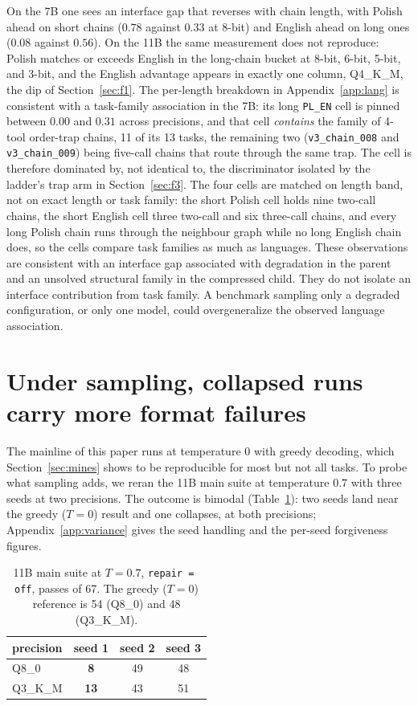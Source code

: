 \documentclass[11pt]{article}
\begin{document}
On the 7B one sees an interface gap that reverses with chain length, with Polish ahead on short chains ($0.78$ against $0.33$ at 8-bit) and English ahead on long ones ($0.08$ against $0.56$). On the 11B the same measurement does not reproduce: Polish matches or exceeds English in the long-chain bucket at 8-bit, 6-bit, 5-bit, and 3-bit, and the English advantage appears in exactly one column, Q4\_K\_M, the dip of Section~\ref{sec:f1}. The per-length breakdown in Appendix~\ref{app:lang} is consistent with a task-family association in the 7B: its long \texttt{PL\_EN} cell is pinned between $0.00$ and $0.31$ across precisions, and that cell \emph{contains} the family of 4-tool order-trap chains, 11 of its 13 tasks, the remaining two (\texttt{v3\_chain\_008} and \texttt{v3\_chain\_009}) being five-call chains that route through the same trap. The cell is therefore dominated by, not identical to, the discriminator isolated by the ladder's trap arm in Section~\ref{sec:f3}. The four cells are matched on length band, not on exact length or task family: the short Polish cell holds nine two-call chains, the short English cell three two-call and six three-call chains, and every long Polish chain runs through the neighbour graph while no long English chain does, so the cells compare task families as much as languages. These observations are consistent with an interface gap associated with degradation in the parent and an unsolved structural family in the compressed child. They do not isolate an interface contribution from task family. A benchmark sampling only a degraded configuration, or only one model, could overgeneralize the observed language association.

\section{Under sampling, collapsed runs carry more format failures}
\label{sec:variance}

The mainline of this paper runs at temperature 0 with greedy decoding, which Section~\ref{sec:mines} shows to be reproducible for most but not all tasks. To probe what sampling adds, we reran the 11B main suite at temperature $0.7$ with three seeds at two precisions. The outcome is bimodal (Table~\ref{tab:variance}): two seeds land near the greedy ($T=0$) result and one collapses, at both precisions; Appendix~\ref{app:variance} gives the seed handling and the per-seed forgiveness figures.

\begin{table}[h]
\centering\small
\caption{11B main suite at $T=0.7$, \texttt{repair\,=\,off}, passes of 67. The greedy ($T=0$) reference is 54 (Q8\_0) and 48 (Q3\_K\_M).}
\label{tab:variance}
\begin{tabular}{lccc}
\toprule
precision & seed 1 & seed 2 & seed 3 \\
\midrule
Q8\_0    & \textbf{8}  & 49 & 48 \\
Q3\_K\_M & \textbf{13} & 43 & 51 \\
\bottomrule
\end{tabular}
\end{table}
\end{document}

